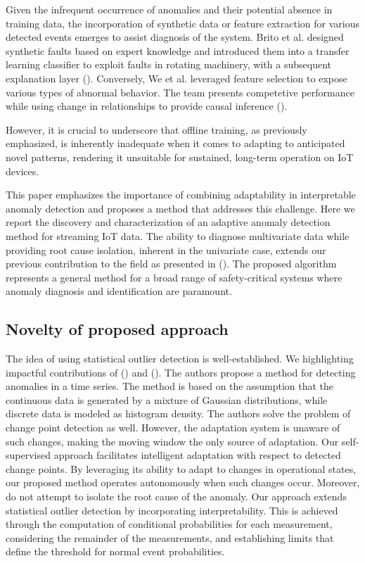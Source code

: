Given the infrequent occurrence of anomalies and their potential absence in training data, the incorporation of synthetic data or feature extraction for various detected events emerges to assist diagnosis of the system. Brito et al. designed synthetic faults based on expert knowledge and introduced them into a transfer learning classifier to exploit faults in rotating machinery, with a subsequent explanation layer (\cite{BRITO2023120860}). Conversely, We et al. leveraged feature selection to expose various types of abnormal behavior. The team presents competetive performance while using change in relationships to provide causal inference (\cite{WU2024121539}).

However, it is crucial to underscore that offline training, as previously emphasized, is inherently inadequate when it comes to adapting to anticipated novel patterns, rendering it unsuitable for sustained, long-term operation on  IoT devices.

This paper emphasizes the importance of combining adaptability in interpretable anomaly detection and proposes a method that addresses this challenge. Here we report the discovery and characterization of an adaptive anomaly detection method for streaming IoT data. The ability to diagnose multivariate data while providing root cause isolation, inherent in the univariate case, extends our previous contribution to the field as presented in (\cite{Wadinger2023}). The proposed algorithm represents a general method for a broad range of safety-critical systems where anomaly diagnosis and identification are paramount.

\subsection{Novelty of proposed approach}
The idea of using statistical outlier detection is well-established. We highlighting impactful contributions of (\cite{Yamanishi2002}) and (\cite{Yamanishi2004}). The authors propose a method for detecting anomalies in a time series. The method is based on the assumption that the continuous data is generated by a mixture of Gaussian distributions, while discrete data is modeled as histogram density. The authors solve the problem of change point detection as well. However, the adaptation system is unaware of such changes, making the moving window the only source of adaptation. Our self-supervised approach facilitates intelligent adaptation with respect to detected change points. By leveraging its ability to adapt to changes in operational states, our proposed method operates autonomously when such changes occur. Moreover, \cite{Yamanishi2004} do not attempt to isolate the root cause of the anomaly. Our approach extends statistical outlier detection by incorporating interpretability. This is achieved through the computation of conditional probabilities for each measurement, considering the remainder of the measurements, and establishing limits that define the threshold for normal event probabilities.

